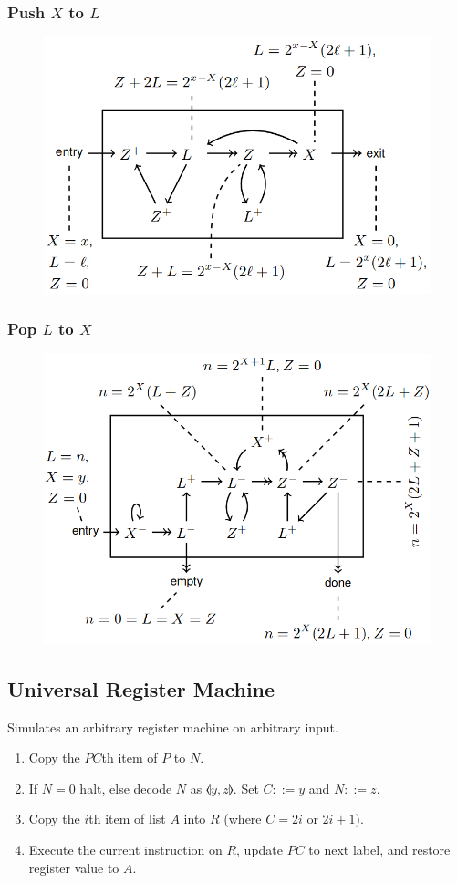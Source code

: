 \documentclass[twocolumn,english]{article}
\begin{document}
\subsubsection*{Push $X$ to $L$}

\begin{figure}[H]
\centering{}\includegraphics[width=0.65\columnwidth]{img/push}
\end{figure}

\subsubsection*{Pop $L$ to $X$}

\begin{figure}[H]
\centering{}\includegraphics[width=0.675\columnwidth]{img/pop}
\end{figure}

\subsection{Universal Register Machine}

Simulates an arbitrary register machine on arbitrary input.
\begin{enumerate}
\item Copy the $PC$th item of $P$ to $N$.
\item If $N=0$ halt, else decode $N$ as $\llangle y,z\rrangle$. Set $C::=y$
and $N::=z$.
\item Copy the $i$th item of list $A$ into $R$ (where $C=2i$ or $2i+1$).
\item Execute the current instruction on $R$, update $PC$ to next label,
and restore register value to $A$.
\end{enumerate}
\end{document}
